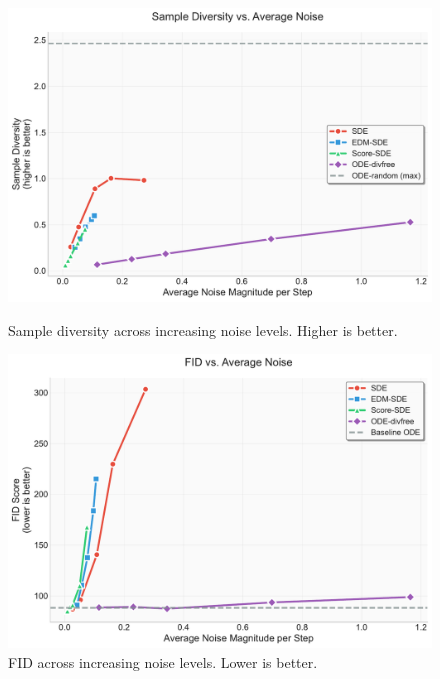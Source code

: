 \documentclass{article}
\begin{document}
\begin{figure}[H]
  \centering
  \begin{minipage}{0.48\textwidth}
    \centering
    \includegraphics[width=\textwidth]{figures/noise_study_div.pdf}
    \caption{Sample diversity across increasing noise levels. Higher is better.}
    \label{fig:div-noise}
  \end{minipage}
  \hfill
  \begin{minipage}{0.48\textwidth}
    \centering
    \includegraphics[width=\textwidth]{figures/noise_study_fid.pdf}
    \caption{FID across increasing noise levels. Lower is better.}
    \label{fig:fid-noise}
  \end{minipage}
\end{figure}
\end{document}
